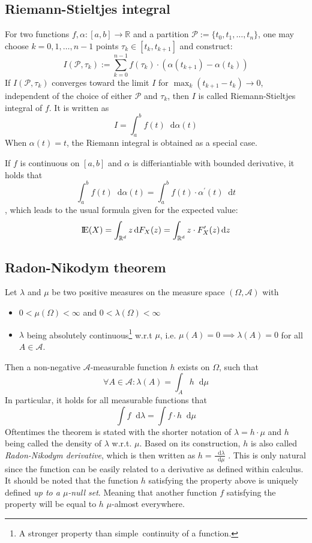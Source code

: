 \documentclass[12pt]{article}
\newcommand*\diff{\mathop{}\!\mathrm{d}}
\newcommand{\E}{\mbox{I\negthinspace E}}
\begin{document}
\subsection{Riemann-Stieltjes integral}
For two functions $f, \alpha : \left[ a, b\right] \to \mathbb{R}$ and a partition $\mathscr{P} := \{ t_0, t_1, \dots , t_n\}$, one may choose $k = 0, 1, \dots, n-1$ points $\tau_k \in \left[ t_k, t_{k+1}\right]$ and construct:
\[
I(\mathscr{P}, \tau_k):= \sum_{k = 0}^{n - 1} f(\tau_ k)\cdot (\alpha (t_{k + 1}) - \alpha (t_k))
\]
If $I(\mathscr{P}, \tau_k)$ converges toward the limit $I$ for $ \max_k (t_{k+1}-t_k) \to 0$,  independent of the choice of either $\mathscr{P}$ and $\tau_k$, then $I$ is called Riemann-Stieltjes integral of $f$. It is written as 
\[
I = \int_a^b f(t) \diff \alpha (t)
\]
When $\alpha (t) = t$, the Riemann integral is obtained as a special case.

If $f$ is continuous on $\left[ a, b\right]$ and $\alpha$ is differiantiable with bounded derivative, it holds that
\[
\int_a^b f(t) \diff \alpha (t) = \int_a^b f(t) \cdot \alpha^{\prime} (t) \diff t
\]
, which leads to the usual formula given for the expected value:
\[
\E (X) = \int_{\mathbb{R}^d } z \diff F_X(z) = \int_{\mathbb{R}^d } z \cdot F_X^{\prime}(z)\diff z
\]

\subsection{Radon-Nikodym theorem}
Let $\lambda$ and $\mu$ be two positive measures on the measure space $(\Omega , \mathscr{A})$ with
\begin{itemize}
\item $0 < \mu (\Omega ) < \infty$ and $0 < \lambda (\Omega ) < \infty$
\item $\lambda$ being absolutely continuous\footnote{A stronger property than \glqq simple\grqq \ continuity of a function.} w.r.t $\mu$, i.e. $\mu (A) = 0 \implies \lambda (A) = 0$ for all $A \in \mathscr{A}$.
\end{itemize}
Then a non-negative $\mathscr{A}$-measurable function $h$ exists on $\Omega$, such that
\[
\forall A \in \mathscr{A} : \lambda (A) = \int_A h \diff \mu
\]
In particular, it holds for all measurable functions that
\[
\int f \diff \lambda = \int f \cdot h \diff \mu
\]
Oftentimes the theorem is stated with the shorter notation of $\lambda = h \cdot \mu$ and $h$ being called the density of $\lambda$ w.r.t. $\mu$. Based on its construction, $h$ is also called \textit{Radon-Nikodym derivative}, which is then written as $h = \frac{\diff \lambda}{\diff \mu}$ . This is only natural since the function can be easily related to a derivative as defined within calculus. \\
It should be noted that the function $h$ satisfying the property above is uniquely defined \textit{up to a $\mu$-null set}. Meaning that another function $f$ satisfying the property will be equal to $h$ $\mu$-almost everywhere.
\end{document}

